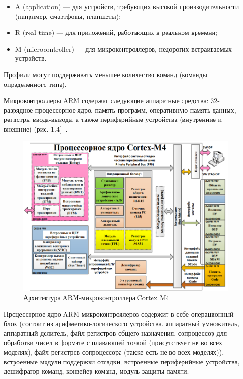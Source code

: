 \documentclass[12pt, oneside]{altsu-report}
\begin{document}
\begin{itemize}
    \item A (application) --- для устройств, требующих высокой производительности (например, смартфоны, планшеты);

    \item R (real time) --- для приложений, работающих в реальном времени;

    \item M (microcontroller) --- для микроконтроллеров, недорогих встраиваемых уст\-ройств.
\end{itemize}

Профили могут поддерживать меньшее количество команд (команды определенного типа).

Микроконтроллеры ARM содержат следующие аппаратные средства: 32-разрядное процессорное ядро, память программ, оперативную память данных, регистры ввода-вывода, а также периферийные устройства (внутренние и внешние) (рис. 1.4)~\cite{Program_model_ARM}.

\begin{figure}[!ht]
    \centering
    \includegraphics[scale=0.75]{Architecture_ARM.png}
    \caption{Архитектура ARM-микроконтроллера Cortex M4}
    \label{fig:architecture_arm}
\end{figure}

Процессорное ядро ARM-микроконтроллеров содержит в себе операционный блок (состоит из арифметико-логического устройства, аппаратный умножитель, аппаратный делитель, файл регистров общего назначения, сопроцессор для обработки чисел в формате с плавающей точкой (присутствует не во всех моделях), файл регистров сопроцессора (также есть не во всех моделях)), встроенные модули поддержки отладки, встроенные периферийные устройства, дешифратор команд, конвейер команд, модуль защиты памяти.
\end{document}

